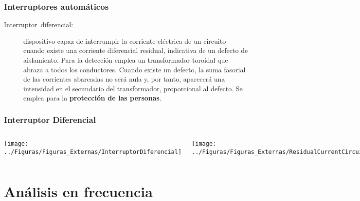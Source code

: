 \documentclass[serif, xcolor=dvipsnames]{beamer}
\begin{document}
\begin{frame}
  \frametitle{Interruptores automáticos}
  \begin{description}
  \item [{Interruptor~diferencial:}] dispositivo capaz de interrumpir
    la corriente eléctrica de un circuito cuando existe una corriente
    diferencial residual, indicativa de un defecto de
    aislamiento. Para la detección emplea un transformador toroidal
    que abraza a todos los conductores.  Cuando existe un defecto, la
    suma fasorial de las corrientes abarcadas no será nula y, por
    tanto, aparecerá una intensidad en el secundario del
    transformador, proporcional al defecto. Se emplea para la
    \textbf{protección de las personas}.
  \end{description}

\end{frame}
\begin{frame}
  \frametitle{Interruptor Diferencial}
  \begin{columns}[c]%


    \column{4cm}


    \begin{center}
      \texttt{[image: ../Figuras/Figuras\_Externas/InterruptorDiferencial]}
      \par\end{center}


    \column{4cm}


    \begin{center}
      \texttt{[image: ../Figuras/Figuras\_Externas/ResidualCurrentCircuitBreak]}
      \par\end{center}

  \end{columns}%

\end{frame}


\section{Análisis en frecuencia}
\end{document}
